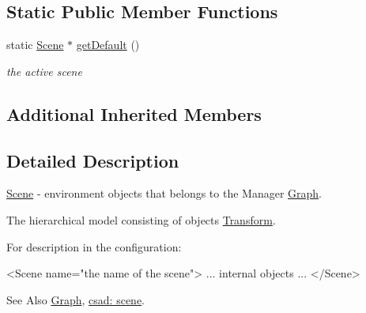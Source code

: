 \subsection*{Static Public Member Functions}
\begin{DoxyCompactItemize}
\item 
\hypertarget{classcsad_1_1_scene_abe6a8e0770c95d3865be7b0f120d664a}{static \hyperlink{classcsad_1_1_scene}{Scene} $\ast$ \hyperlink{classcsad_1_1_scene_abe6a8e0770c95d3865be7b0f120d664a}{get\-Default} ()}\label{classcsad_1_1_scene_abe6a8e0770c95d3865be7b0f120d664a}

\begin{DoxyCompactList}\small\item\em the active scene \end{DoxyCompactList}\end{DoxyCompactItemize}
\subsection*{Additional Inherited Members}


\subsection{Detailed Description}
\hyperlink{classcsad_1_1_scene}{Scene} -\/ environment objects that belongs to the Manager \hyperlink{classcsad_1_1_graph}{Graph}. 

The hierarchical model consisting of objects \hyperlink{classcsad_1_1_transform}{Transform}.

For description in the configuration\-: \begin{DoxyVerb}  <Scene name="the name of the scene">
  ... internal objects ...
  </Scene>
\end{DoxyVerb}


\begin{DoxySeeAlso}{See Also}
\hyperlink{classcsad_1_1_graph}{Graph}, \hyperlink{group__scene}{csad\-: scene}. 
\end{DoxySeeAlso}
